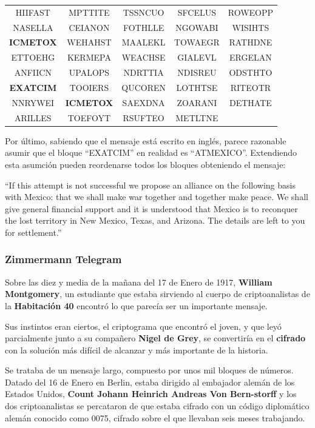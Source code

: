 \documentclass[nochap]{apuntesURJC}
\begin{document}
\begin{center}
\begin{tabular}{ccccc}
HIIFAST & MPTTITE & TSSNCUO & SFCELUS & ROWEOPP\\
NASELLA & CEIANON & FOTHLLE & NGOWABI & WISIHTS\\
\textbf{ICMETOX} & WEHAHST & MAALEKL & TOWAEGR & RATHDNE\\
ETTOEHG & KERMEPA & WEACHSE & GIALEVL & ERGELAN\\
ANFIICN & UPALOPS & NDRTTIA & NDISREU & ODSTHTO\\
\textbf{EXATCIM} & TOOIERS & QUCOREN & LOTHTSE & RITEOTR\\
NNRYWEI & \textbf{ICMETOX} & SAEXDNA & ZOARANI & DETHATE\\
ARILLES & TOEFOYT & RSUFTEO & METLTNE &
\end{tabular}
\end{center}

Por último, sabiendo que el mensaje está escrito en inglés, parece razonable asumir que el bloque ``EXATCIM'' en realidad es ``ATMEXICO''. Extendiendo esta asumción pueden reordenarse todos los bloques obteniendo el mensaje:

\begin{center}
``If this attempt is not successful we propose an alliance on the following basis with Mexico: that we shall make war together and together make peace. We shall give general financial support and it is understood that Mexico is to reconquer the lost territory in New Mexico, Texas, and Arizona. The details are left to you for settlement.''
\end{center}

\subsubsection{Zimmermann Telegram}
Sobre las diez y media de la mañana del 17 de Enero de 1917, \textbf{William Montgomery}, un estudiante que estaba sirviendo al cuerpo de criptoanalistas de la \textbf{Habitación 40} encontró lo que parecía ser un importante mensaje.

Sus instintos eran ciertos, el criptograma que encontró el joven, y que leyó parcialmente junto a su compañero \textbf{Nigel de Grey}, se convertiría en el \textbf{cifrado} con la solución más difícil de alcanzar y más importante de la historia.

Se trataba de un mensaje largo, compuesto por unos mil bloques de números. Datado del 16 de Enero en Berlin, estaba dirigido al embajador alemán de los Estados Unidos, \textbf{Count Johann Heinrich Andreas Von Bern-storff} y los dos criptoanalistas se percataron de que estaba cifrado con un código diplomático alemán conocido como 0075, cifrado sobre el que llevaban seis meses trabajando.
\end{document}
